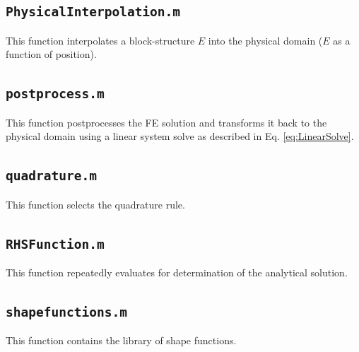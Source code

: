 \documentclass[10pt]{article}
\newcommand*\circled[1]{\tikz[baseline=(char.base)]{
            \node[shape=circle,draw,inner sep=2pt] (char) {#1};}}
\begin{document}
\subsection{\texttt{PhysicalInterpolation.m}}
This function interpolates a block-structure \(E\) into the physical domain (\(E\) as a function of position).


\subsection{\texttt{postprocess.m}}
This function postprocesses the FE solution and transforms it back to the physical domain using a linear system solve as described in Eq. \eqref{eq:LinearSolve}.


\subsection{\texttt{quadrature.m}}
This function selects the quadrature rule.


\subsection{\texttt{RHSFunction.m}}
This function repeatedly evaluates \circled{A} for determination of the analytical solution.


\subsection{\texttt{shapefunctions.m}}
This function contains the library of shape functions.

\end{document}
